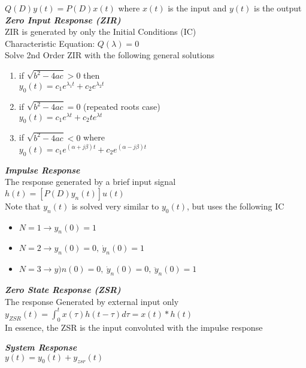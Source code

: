     $Q(D)y(t) = P(D)x(t)$ where
    $x(t)$ is the input and $y(t)$ is the output\\
    \vspace{5pt}
    \textbf{\emph{Zero Input Response (ZIR)}}\\
    ZIR is generated by only the Initial Conditions (IC)\\
    Characteristic Equation: $Q(\lambda ) = 0$ \\
    Solve 2nd Order ZIR with the following general solutions
    \begin{enumerate}[leftmargin =.7cm, noitemsep,nolistsep]
    \item if $\sqrt{b^2-4ac} > 0$ then\\
        $y_0(t) = c_1 e^{\lambda_1 t} + c_2 e^{\lambda_2 t}$
    \item if $\sqrt{b^2-4ac} = 0$ (repeated roots case)\\
    $y_0(t) = c_1 e^{\lambda t} + c_2 te^{\lambda t}$
    \item if $\sqrt{b^2-4ac} <0$  where\\
    $y_0(t) = c_1 e^{(\alpha + j \beta ) t} + c_2 e^{(\alpha- j \beta )t}$
    \textbf{}
    \end{enumerate}
    \vspace{5pt}
    \textbf{\emph{Impulse Response}}\\
    The response generated by a brief input signal\\
    $h(t)=[P(D)y_n(t)]u(t)$\\
    Note that $y_n(t)$ is solved very similar to $y_0(t)$, but uses the following IC
    \begin{itemize} [leftmargin =.7cm,noitemsep,nolistsep]
    \item $N=1 \rightarrow y_n(0) = 1$
    \item $N=2 \rightarrow y_n(0) = 0, \ \dot{y}_n(0) = 1$
    \item $N = 3 \rightarrow y)n(0) = 0,\ \dot{y}_n(0) = 0,\ \ddot{y}_n(0)=1$
    \end{itemize}
    \vspace{5pt}
    \textbf{\emph{Zero State Response (ZSR)}}\\
    The response Generated by external input only\\
    $y_{ZSR} (t) =\int_0^t x(\tau)h(t-\tau) d\tau = x(t)*h(t)$\\
    In essence, the ZSR is the input convoluted with the impulse response
    \begin{itemize} [leftmargin =.7cm,noitemsep,nolistsep]

    \end{itemize}
    \vspace{5pt}
        \textbf{\emph{System Response}}\\
    $y(t) = y_0(t) + y_{zsr}(t)$
